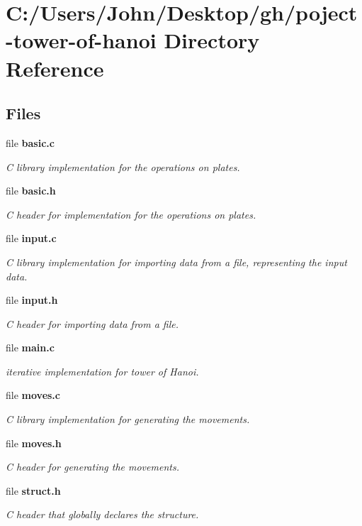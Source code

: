 \section{C\+:/\+Users/\+John/\+Desktop/gh/poject-\/tower-\/of-\/hanoi Directory Reference}
\label{dir_1611c60468ade8f098355cdcbec472c3}
\subsection*{Files}
\begin{DoxyCompactItemize}
\item 
file \textbf{ basic.\+c}
\begin{DoxyCompactList}\small\item\em C library implementation for the operations on plates. \end{DoxyCompactList}\item 
file \textbf{ basic.\+h}
\begin{DoxyCompactList}\small\item\em C header for implementation for the operations on plates. \end{DoxyCompactList}\item 
file \textbf{ input.\+c}
\begin{DoxyCompactList}\small\item\em C library implementation for importing data from a file, representing the input data. \end{DoxyCompactList}\item 
file \textbf{ input.\+h}
\begin{DoxyCompactList}\small\item\em C header for importing data from a file. \end{DoxyCompactList}\item 
file \textbf{ main.\+c}
\begin{DoxyCompactList}\small\item\em iterative implementation for tower of Hanoi. \end{DoxyCompactList}\item 
file \textbf{ moves.\+c}
\begin{DoxyCompactList}\small\item\em C library implementation for generating the movements. \end{DoxyCompactList}\item 
file \textbf{ moves.\+h}
\begin{DoxyCompactList}\small\item\em C header for generating the movements. \end{DoxyCompactList}\item 
file \textbf{ struct.\+h}
\begin{DoxyCompactList}\small\item\em C header that globally declares the structure. \end{DoxyCompactList}\end{DoxyCompactItemize}
